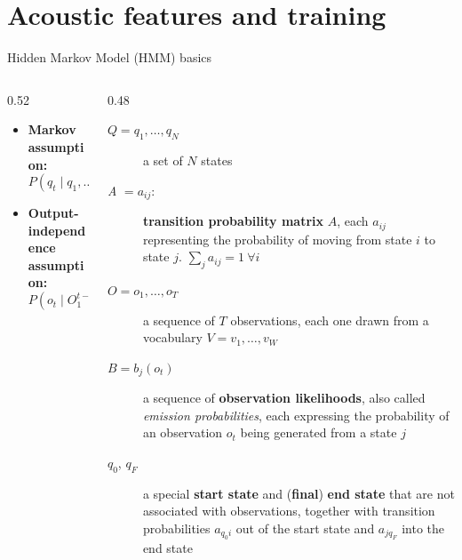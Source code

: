 \section{Acoustic features and training}

\begin{frame}{Hidden Markov Model (HMM) basics}
  \begin{columns}[T,onlytextwidth]
    \begin{column}{0.52\textwidth}
      \begin{itemize}
        \item \textbf{Markov assumption:}
        \[
          P(q_t \mid q_1, \ldots, q_{t-1}) = P(q_t \mid q_{t-1})
        \]
        \item \textbf{Output-independence assumption:}
        \[
          P(o_t \mid O_1^{t-1}, q_1^t) = P(o_t \mid q_t)
        \]
      \end{itemize}
    \end{column}
    \begin{column}{0.48\textwidth}
      \begin{tcolorbox}[colback=gray!10, boxrule=0pt, arc=2mm, left=0.7em, right=0.7em, top=0.7em, bottom=0.7em]
      {\scriptsize
      \begin{description}
        \item[$Q = q_1, \ldots, q_N$] a set of $N$ states
        \item[\textit{A} $= a_{ij}$:] \textbf{transition probability matrix} $A$, each $a_{ij}$ representing the probability of moving from state $i$ to state $j$. $\sum_j a_{ij} = 1\ \forall i$
        \item[$O = o_1, \ldots, o_T$] a sequence of $T$ observations, each one drawn from a vocabulary $V = v_1, \ldots, v_W$
        \item[$B = b_j(o_t)$] a sequence of \textbf{observation likelihoods}, also called \textit{emission probabilities}, each expressing the probability of an observation $o_t$ being generated from a state $j$
        \item[$q_0$, $q_F$] a special \textbf{start state} and (\textbf{final}) \textbf{end state} that are not associated with observations, together with transition probabilities $a_{q_0i}$ out of the start state and $a_{j q_F}$ into the end state
      \end{description}
      }
      \end{tcolorbox}
 
    \end{column}
  \end{columns}
\end{frame}


